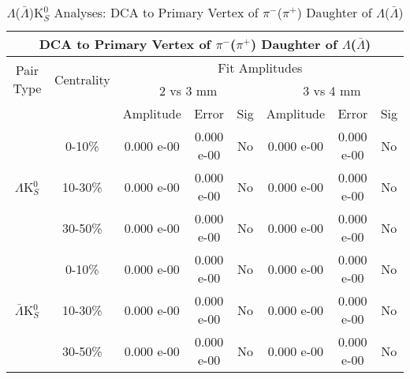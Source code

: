 \documentclass[../AnalysisNoteJBuxton.tex]{subfiles}
\begin{document}
\begin{table}
 \centering
 \begin{tabular}{|c|c|c|c|c||c|c|c|}
  \multicolumn{8}{c}{DCA to Primary Vertex of $\pi^{-}$($\pi^{+}$) Daughter of $\Lambda$($\bar{\Lambda}$)} \\
  \hline
  \multirow{2}{*}{Pair Type} & \multirow{2}{*}{Centrality} & \multicolumn{6}{c|}{Fit Amplitudes} \\
  \cline{3-8}
   & & \multicolumn{3}{c||}{2 vs 3 mm} & \multicolumn{3}{c|}{3 vs 4 mm} \\
  \hline
   & & Amplitude & Error & Sig & Amplitude & Error & Sig \\
  \hline  
  \multirow{3}{*}{$\Lambda$K$^{0}_{S}$}  
   &  0-10\% & 0.000 e-00 & 0.000 e-00 & No & 0.000 e-00 & 0.000 e-00 & No \\
   & 10-30\% & 0.000 e-00 & 0.000 e-00 & No & 0.000 e-00 & 0.000 e-00 & No \\
   & 30-50\% & 0.000 e-00 & 0.000 e-00 & No & 0.000 e-00 & 0.000 e-00 & No \\
  \hline  
  \multirow{3}{*}{$\bar{\Lambda}$K$^{0}_{S}$}  
   &  0-10\% & 0.000 e-00 & 0.000 e-00 & No & 0.000 e-00 & 0.000 e-00 & No \\
   & 10-30\% & 0.000 e-00 & 0.000 e-00 & No & 0.000 e-00 & 0.000 e-00 & No \\
   & 30-50\% & 0.000 e-00 & 0.000 e-00 & No & 0.000 e-00 & 0.000 e-00 & No \\
  \hline
 \end{tabular}
 \caption{$\Lambda$($\bar{\Lambda}$)K$^{0}_{S}$ Analyses: DCA to Primary Vertex of $\pi^{-}$($\pi^{+}$) Daughter of $\Lambda$($\bar{\Lambda}$)}
 \label{tab:DcaToPrimVertexPionDaughtOfLamLamK0}
\end{table}
\end{document}
